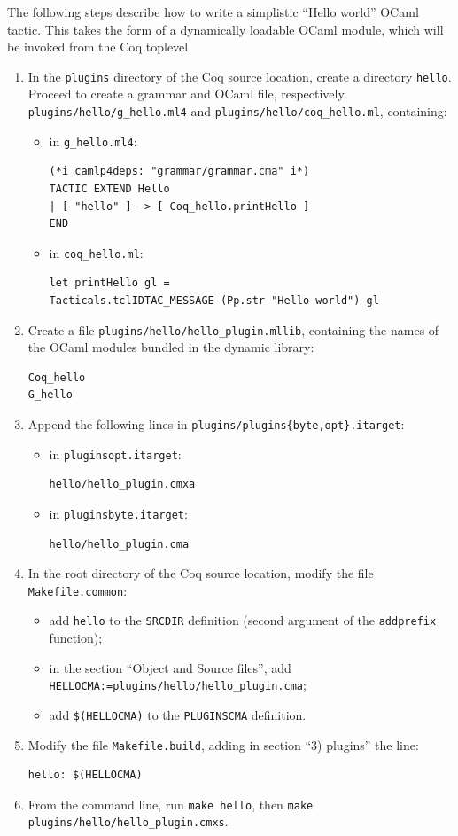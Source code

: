 \documentclass[a4paper,pdftex]{article}
\begin{document}
The following steps describe how to write a simplistic ``Hello world'' OCaml
tactic. This takes the form of a dynamically loadable OCaml module, which will
be invoked from the Coq toplevel.
\begin{enumerate}
\item In the \verb+plugins+ directory of the Coq source location, create a
directory \verb+hello+. Proceed to create a grammar and OCaml file, respectively
\verb+plugins/hello/g_hello.ml4+ and \verb+plugins/hello/coq_hello.ml+,
containing:
  \begin{itemize}
  \item in \verb+g_hello.ml4+:
\begin{verbatim}
(*i camlp4deps: "grammar/grammar.cma" i*)
TACTIC EXTEND Hello
| [ "hello" ] -> [ Coq_hello.printHello ]
END
\end{verbatim}
  \item in \verb+coq_hello.ml+:
\begin{verbatim}
let printHello gl =
Tacticals.tclIDTAC_MESSAGE (Pp.str "Hello world") gl
  \end{verbatim}
  \end{itemize}
\item Create a file \verb+plugins/hello/hello_plugin.mllib+, containing the
names of the OCaml modules bundled in the dynamic library:
\begin{verbatim}
Coq_hello
G_hello
\end{verbatim}
\item Append the following lines in \verb+plugins/plugins{byte,opt}.itarget+:
\begin{itemize}
  \item in \verb+pluginsopt.itarget+:
\begin{verbatim}
hello/hello_plugin.cmxa
\end{verbatim}
  \item in \verb+pluginsbyte.itarget+:
\begin{verbatim}
hello/hello_plugin.cma
\end{verbatim}
\end{itemize}
\item In the root directory of the Coq source location, modify the file
\verb+Makefile.common+:
  \begin{itemize}
  \item add \verb+hello+ to the \verb+SRCDIR+ definition (second argument of the
  \verb+addprefix+ function);
  \item in the section ``Object and Source files'', add \verb+HELLOCMA:=plugins/hello/hello_plugin.cma+;
  \item add \verb+$(HELLOCMA)+ to the \verb+PLUGINSCMA+ definition.
  \end{itemize}
\item Modify the file \verb+Makefile.build+, adding in section ``3) plugins'' the
line:
\begin{verbatim}
hello: $(HELLOCMA)
\end{verbatim}
\item From the command line, run \verb+make hello+, then \verb+make plugins/hello/hello_plugin.cmxs+.
\end{enumerate}
\end{document}
